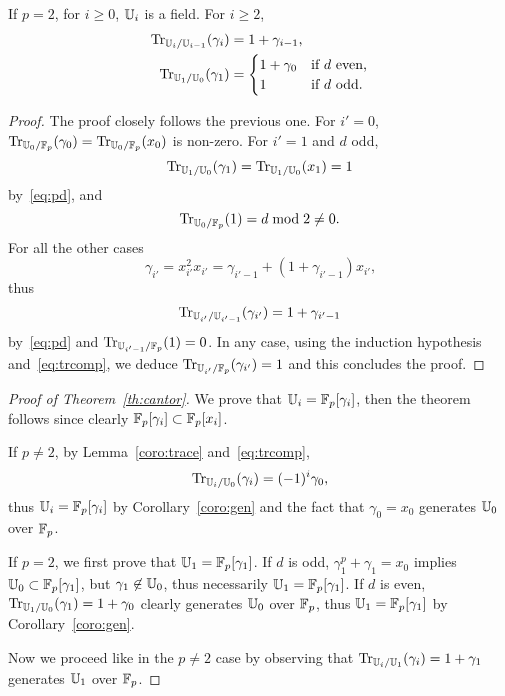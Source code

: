 \begin{lemma}
  If $p=2$, for $i \ge 0$, $\mathbb{U}_i$ is a field. For $i\ge2$,
  \begin{align}
    \operatorname{Tr}_{\mathbb{U}_i/\mathbb{U}_{i-1}}(\gamma_i) &= 1+\gamma_{i-1}
    \text{,}\\
    \operatorname{Tr}_{\mathbb{U}_1/\mathbb{U}_0}(\gamma_1) &= \begin{cases}
      1+\gamma_0 &\text{if $d$ even,}\\
      1          &\text{if $d$ odd.}
    \end{cases}
  \end{align}
\end{lemma}
\begin{proof}
  The proof closely follows the previous one. For $i'=0$,
  $\operatorname{Tr}_{\mathbb{U}_0/\mathbb{F}_p}(\gamma_0)=\operatorname{Tr}_{\mathbb{U}_0/\mathbb{F}_p}(x_0)$ is non-zero.  For
  $i'=1$ and $d$ odd, 
  \begin{equation}
    \label{eq:66}
    \operatorname{Tr}_{\mathbb{U}_1/\mathbb{U}_0}(\gamma_1)=\operatorname{Tr}_{\mathbb{U}_1/\mathbb{U}_0}(x_1)  = 1    
  \end{equation}
  by~\ref{eq:pd}, and
  \begin{equation}
    \label{eq:67}
    \operatorname{Tr}_{\mathbb{U}_0/\mathbb{F}_p}(1) = d\bmod 2\ne0
    \text{.}
  \end{equation}
  For all the other cases 
  \begin{equation}
    \label{eq:68}
    \gamma_{i'}=x_{i'}^2x_{i'}=\gamma_{i'-1} +
    (1+\gamma_{i'-1})x_{i'}\text{,}    
  \end{equation}
  thus
  \begin{equation}
    \operatorname{Tr}_{\mathbb{U}_{i'}/\mathbb{U}_{i'-1}}(\gamma_{i'})=1+\gamma_{i'-1}    
  \end{equation}
  by~\ref{eq:pd} and $\operatorname{Tr}_{\mathbb{U}_{i'-1}/\mathbb{F}_p}(1) = 0$. In any case, using
  the induction hypothesis and~\ref{eq:trcomp}, we deduce
  $\operatorname{Tr}_{\mathbb{U}_{i'}/\mathbb{F}_p}(\gamma_{i'}) = 1$ and this concludes the proof.
\end{proof}


\begin{proof}[Proof of Theorem~\ref{th:cantor}]
  We prove that $\mathbb{U}_i=\mathbb{F}_p[\gamma_i]$, then the theorem follows since
  clearly $\mathbb{F}_p[\gamma_i]\subset\mathbb{F}_p[x_i]$.

  If $p\ne2$, by Lemma~\ref{coro:trace} and~\ref{eq:trcomp},
  \begin{equation}
    \label{eq:69}
    \operatorname{Tr}_{\mathbb{U}_i/\mathbb{U}_0}(\gamma_i) = (-1)^i\gamma_0
    \text{,}    
  \end{equation}
  thus $\mathbb{U}_i=\mathbb{F}_p[\gamma_i]$ by Corollary~\ref{coro:gen} and the fact
  that $\gamma_0 = x_0$ generates $\mathbb{U}_0$ over $\mathbb{F}_p$.

  If $p=2$, we first prove that $\mathbb{U}_1=\mathbb{F}_p[\gamma_1]$.  If $d$ is odd,
  $\gamma_1^p + \gamma_1 = x_0$ implies $\mathbb{U}_0\subset\mathbb{F}_p[\gamma_1]$,
  but $\gamma_1\not\in\mathbb{U}_0$, thus necessarily $\mathbb{U}_1=\mathbb{F}_p[\gamma_1]$.
  If $d$ is even, $\operatorname{Tr}_{\mathbb{U}_1/\mathbb{U}_0}(\gamma_1)=1+\gamma_0$ clearly
  generates $\mathbb{U}_0$ over $\mathbb{F}_p$, thus $\mathbb{U}_1=\mathbb{F}_p[\gamma_1]$ by
  Corollary~\ref{coro:gen}.
  
  Now we proceed like in the $p\ne2$ case by observing that
  $\operatorname{Tr}_{\mathbb{U}_i/\mathbb{U}_1}(\gamma_i)=1+\gamma_1$ generates $\mathbb{U}_1$ over $\mathbb{F}_p$.
\end{proof}

